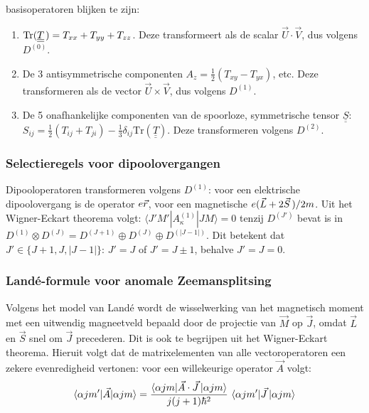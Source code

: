 \begin{enumerate}
      basisoperatoren blijken te zijn:
      \begin{enumerate}
      \item $\mbox{Tr}(\underline{\underline{T}}\hspace*{0.5mm})=T_{xx}+T_{yy}+T_{zz}$. Deze transformeert
            als de scalar $\vec{U}\cdot\vec{V}$, dus volgens $D^{(0)}$.
      \item De 3 antisymmetrische componenten $A_z=\frac{1}{2}(T_{xy}-T_{yx})$, etc.
            Deze transformeren als de vector $\vec{U}\times\vec{V}$, dus
            volgens $D^{(1)}$.
      \item De 5 onafhankelijke componenten van de spoorloze, symmetrische tensor
            $\underline{\underline{S}}$:\\
            $S_{ij}=\frac{1}{2}(T_{ij}+T_{ji})-\frac{1}{3}\delta_{ij}\mbox{Tr}(\underline{\underline{T}})$.
            Deze transformeren volgens $D^{(2)}$.
      \end{enumerate}
\end{enumerate}

\subsubsection{Selectieregels voor dipoolovergangen}
Dipooloperatoren transformeren volgens $D^{(1)}$: voor een elektrische dipoolovergang
is de operator $e\vec{r}$, voor een magnetische $e(\vec{L}+2\vec{S}\,)/2m$.
\npar
Uit het Wigner-Eckart theorema volgt: $\langle J'M'|A^{(1)}_{\kappa}|JM\rangle=0$
tenzij $D^{(J')}$ bevat is in $D^{(1)}\otimes D^{(J)}=D^{(J+1)}\oplus D^{(J)}\oplus D^{(|J-1|)}$.
Dit betekent dat $J'\in\{ J+1,J,|J-1|\}$: $J'=J$ of $J'=J\pm1$, behalve $J'=J=0$.

\subsubsection{Land\'e-formule voor anomale Zeemansplitsing}
Volgens het model van Land\'e wordt de wisselwerking van het magnetisch moment
met een uitwendig magneetveld bepaald door de projectie van $\vec{M}$ op $\vec{J}$,
omdat $\vec{L}$ en $\vec{S}$ snel om $\vec{J}$ precederen. Dit is ook te
begrijpen uit het Wigner-Eckart theorema. Hieruit volgt dat de matrixelementen
van alle vectoroperatoren een zekere evenredigheid vertonen: voor een
willekeurige operator $\vec{A}$ volgt:
\[
\langle\alpha jm'|\vec{A}|\alpha jm\rangle=
\frac{\langle\alpha jm|\vec{A}\cdot\vec{J}\,|\alpha jm\rangle}{j(j+1)\hbar^2}~
\langle\alpha jm'|\vec{J}\,|\alpha jm\rangle
\]

